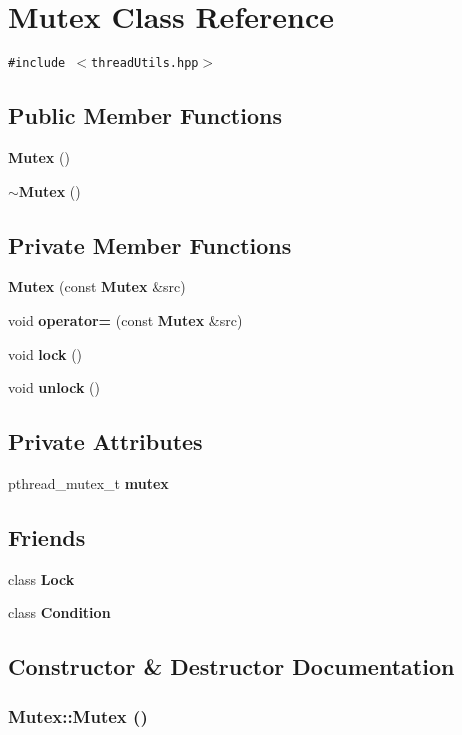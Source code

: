 \section{Mutex Class Reference}
\label{classMutex}
{\tt \#include $<$thread\-Utils.hpp$>$}

\subsection*{Public Member Functions}
\begin{CompactItemize}
\item 
{\bf Mutex} ()
\item 
{\bf $\sim$Mutex} ()
\end{CompactItemize}
\subsection*{Private Member Functions}
\begin{CompactItemize}
\item 
{\bf Mutex} (const {\bf Mutex} \&src)
\item 
void {\bf operator=} (const {\bf Mutex} \&src)
\item 
void {\bf lock} ()
\item 
void {\bf unlock} ()
\end{CompactItemize}
\subsection*{Private Attributes}
\begin{CompactItemize}
\item 
pthread\_\-mutex\_\-t {\bf mutex}
\end{CompactItemize}
\subsection*{Friends}
\begin{CompactItemize}
\item 
class {\bf Lock}
\item 
class {\bf Condition}
\end{CompactItemize}


\subsection{Constructor \& Destructor Documentation}
\subsubsection{\setlength{\rightskip}{0pt plus 5cm}Mutex::Mutex ()\hspace{0.3cm}{\tt  [inline]}}\label{classMutex_593423d868daf926c7b0d63a833ae29a}


